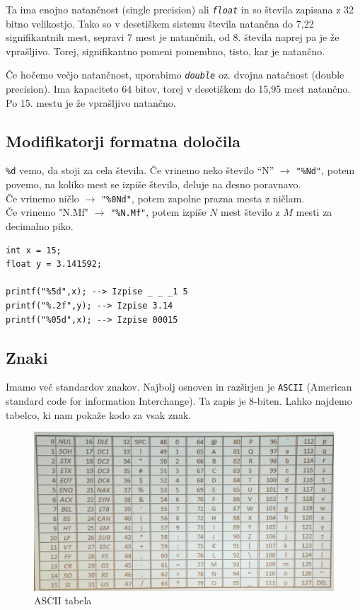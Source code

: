 \documentclass[a4paper, 12pt]{article}
\begin{document}
Ta ima enojno natančnost (single precision) ali \emph{\texttt{float}} in so števila zapisana z 32 bitno velikostjo. Tako so v desetiškem sistemu števila natančna do 7,22 signifikantnih mest, sepravi 7 mest je natančnih, od 8. števila naprej pa je že vprašljivo. Torej, signifikantno pomeni pomembno, tisto, kar je natančno.\

Če hočemo večjo natančnost, uporabimo \emph{\texttt{double}} oz. dvojna natačnost (double precision). Ima kapaciteto 64 bitov, torej v desetiškem do 15,95 mest natančno. Po 15. mestu je že vprašljivo natančno.


\subsection{Modifikatorji formatna določila}
\verb|%d| vemo, da stoji za cela števila. Če vrinemo neko število ``N'' $\to$ \texttt{"\%Nd"}, potem povemo, na koliko mest se izpiše število, deluje na desno poravnavo.\\
Če vrinemo ničlo $\to$ \texttt{"\%0Nd"}, potem zapolne prazna mesta z ničlam.\\
Če vrinemo "N.Mf" $\to$ \texttt{"\%N.Mf"}, potem izpiše $N$ mest število z $M$ mesti za decimalno piko.

\begin{lstlisting}
int x = 15;
float y = 3.141592;

printf("%5d",x); --> Izpise _ _ _1 5
printf("%.2f",y); --> Izpise 3.14
printf("%05d",x); --> Izpise 00015
\end{lstlisting} 

\subsection{Znaki}
Imamo več standardov znakov. Najbolj osnoven in razširjen je \texttt{ASCII} (American standard code for information Interchange). Ta zapis je 8-biten. Lahko najdemo tabelco, ki nam pokaže kodo za vsak znak.

\begin{figure}[h!]
	\centering
	\includegraphics[width=0.7\linewidth]{images/ascii.jpg}
	\caption{ASCII tabela}
	\label{fig:ascii-tabela }
\end{figure}
\end{document}
